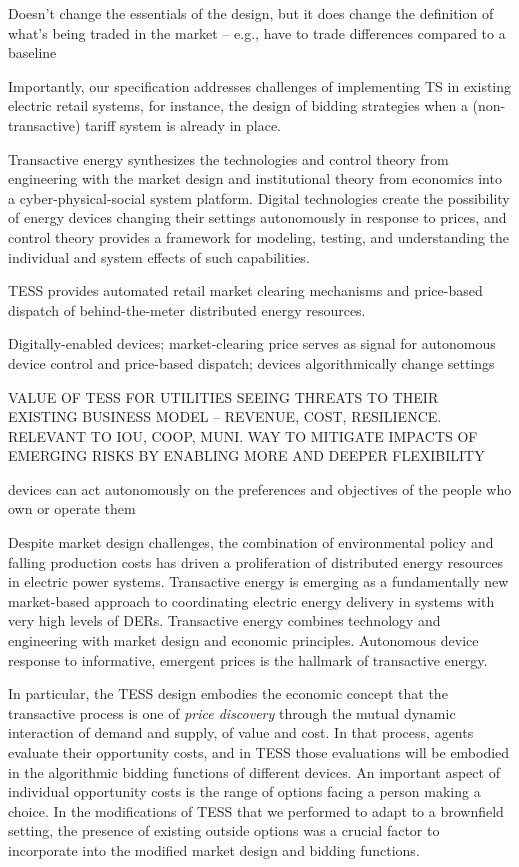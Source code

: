 Doesn't change the essentials of the design, but it does change the definition of what's being traded in the market -- e.g., have to trade differences compared to a baseline

Importantly, our specification addresses challenges of implementing TS in existing electric retail systems, for instance, the design of bidding strategies when a (non-transactive) tariff system is already in place.

Transactive energy synthesizes the technologies and control theory from engineering with the market design and institutional theory from economics into a cyber-physical-social system platform. Digital technologies create the possibility of energy devices changing their settings autonomously in response to prices, and control theory provides a framework for modeling, testing, and understanding the individual and system effects of such capabilities.

TESS provides automated retail market clearing mechanisms and price-based dispatch of behind-the-meter distributed energy resources. 



Digitally-enabled devices; market-clearing price serves as signal for autonomous device control and price-based dispatch; devices algorithmically change settings

VALUE OF TESS FOR UTILITIES SEEING THREATS TO THEIR EXISTING BUSINESS MODEL -- REVENUE, COST, RESILIENCE. RELEVANT TO IOU, COOP, MUNI. WAY TO MITIGATE IMPACTS OF EMERGING RISKS BY ENABLING MORE AND DEEPER FLEXIBILITY

devices can act autonomously on the preferences and objectives of the people who own or operate them

Despite market design challenges, the combination of environmental policy and falling production costs has driven a proliferation of distributed energy resources in electric power systems. Transactive energy is emerging as a fundamentally new market-based approach to coordinating electric energy delivery in systems with very high levels of DERs. Transactive energy combines technology and engineering with market design and economic principles. Autonomous device response to informative, emergent prices is the hallmark of transactive energy.


In particular, the TESS design embodies the economic concept that the transactive process is one of \emph{price discovery} through the mutual dynamic interaction of demand and supply, of value and cost. In that process, agents evaluate their opportunity costs, and in TESS those evaluations will be embodied in the algorithmic bidding functions of different devices. An important aspect of individual opportunity costs is the range of options facing a person making a choice. In the modifications of TESS that we performed to adapt to a brownfield setting, the presence of existing outside options was a crucial factor to incorporate into the modified market design and bidding functions.


